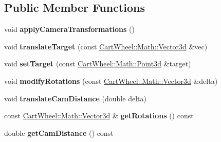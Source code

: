 \subsection*{Public Member Functions}
\begin{DoxyCompactItemize}
\item 
\hypertarget{classCartWheel_1_1GL_1_1GLCamera_a205d3359e8bd228cfd3fb4c10ea6a315}{
void {\bfseries applyCameraTransformations} ()}
\label{classCartWheel_1_1GL_1_1GLCamera_a205d3359e8bd228cfd3fb4c10ea6a315}

\item 
\hypertarget{classCartWheel_1_1GL_1_1GLCamera_a25b413c4975cbe841c01058503944e08}{
void {\bfseries translateTarget} (const \hyperlink{classCartWheel_1_1Math_1_1Vector3d}{CartWheel::Math::Vector3d} \&vec)}
\label{classCartWheel_1_1GL_1_1GLCamera_a25b413c4975cbe841c01058503944e08}

\item 
\hypertarget{classCartWheel_1_1GL_1_1GLCamera_a0f62216cd7cd43c9ae2ff0c9ab236461}{
void {\bfseries setTarget} (const \hyperlink{classCartWheel_1_1Math_1_1Point3d}{CartWheel::Math::Point3d} \&target)}
\label{classCartWheel_1_1GL_1_1GLCamera_a0f62216cd7cd43c9ae2ff0c9ab236461}

\item 
\hypertarget{classCartWheel_1_1GL_1_1GLCamera_ac47dc01ce6889f6371a8ade0fb207922}{
void {\bfseries modifyRotations} (const \hyperlink{classCartWheel_1_1Math_1_1Vector3d}{CartWheel::Math::Vector3d} \&delta)}
\label{classCartWheel_1_1GL_1_1GLCamera_ac47dc01ce6889f6371a8ade0fb207922}

\item 
\hypertarget{classCartWheel_1_1GL_1_1GLCamera_ad6c1937c0a19803816dd549c2e9ae17c}{
void {\bfseries translateCamDistance} (double delta)}
\label{classCartWheel_1_1GL_1_1GLCamera_ad6c1937c0a19803816dd549c2e9ae17c}

\item 
\hypertarget{classCartWheel_1_1GL_1_1GLCamera_a7e200385db8216d6df5a835acec44a74}{
const \hyperlink{classCartWheel_1_1Math_1_1Vector3d}{CartWheel::Math::Vector3d} \& {\bfseries getRotations} () const }
\label{classCartWheel_1_1GL_1_1GLCamera_a7e200385db8216d6df5a835acec44a74}

\item 
\hypertarget{classCartWheel_1_1GL_1_1GLCamera_a0bca3c7e3e1544e7593507f17c2eee8f}{
double {\bfseries getCamDistance} () const }
\label{classCartWheel_1_1GL_1_1GLCamera_a0bca3c7e3e1544e7593507f17c2eee8f}


\end{DoxyCompactItemize}
